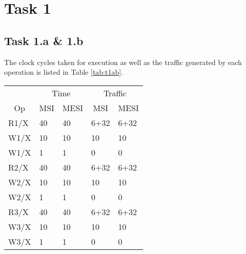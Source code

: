 \section{Task 1}
\subsection{Task 1.a \& 1.b}

The clock cycles taken for execution as well as the traffic generated by each
operation is listed in Table \ref{tab:t1ab}.

\begin{table}[h]
\centering
\begin{tabular}{l|ll|ll}
                        & \multicolumn{2}{c|}{Time}                           & \multicolumn{2}{c|}{Traffic}                       \\
\multicolumn{1}{c|}{Op} & \multicolumn{1}{c}{MSI} & \multicolumn{1}{c|}{MESI} & \multicolumn{1}{c}{MSI} & \multicolumn{1}{c}{MESI} \\ \hline
R1/X                    & 40                      & 40                        & 6+32                    & 6+32                     \\
W1/X                    & 10                      & 10                        & 10                      & 10                       \\
W1/X                    & 1                       & 1                         & 0                       & 0                        \\
R2/X                    & 40                      & 40                        & 6+32                    & 6+32                     \\
W2/X                    & 10                      & 10                        & 10                      & 10                       \\
W2/X                    & 1                       & 1                         & 0                       & 0                        \\
R3/X                    & 40                      & 40                        & 6+32                    & 6+32                     \\
W3/X                    & 10                      & 10                        & 10                      & 10                       \\
W3/X                    & 1                       & 1                         & 0                       & 0                        \\

\end{tabular}
\end{table}
